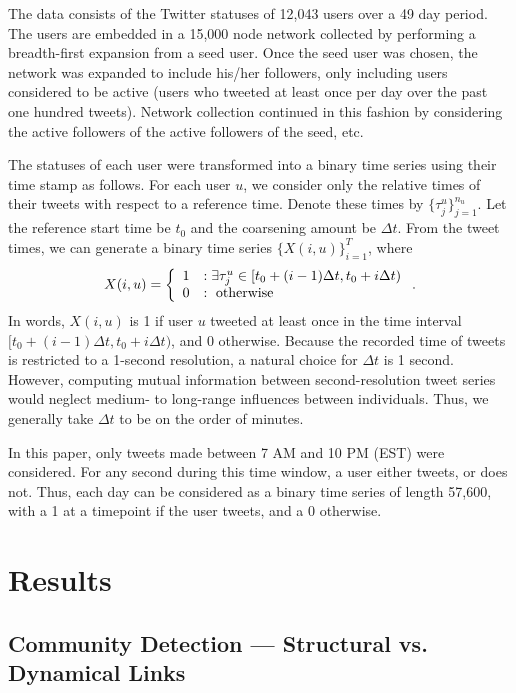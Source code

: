 \documentclass[12pt]{article}
\begin{document}
The data consists of the Twitter statuses of 12,043 users over a 49 day period. The users are embedded in a 15,000 node network collected by performing a breadth-first expansion from a seed user. Once the seed user was chosen, the network was expanded to include his/her followers, only including users considered to be active (users who tweeted at least once per day over the past one hundred tweets). Network collection continued in this fashion by considering the active followers of the active followers of the seed, etc.

The statuses of each user were transformed into a binary time series using their time stamp as follows. For each user $u$, we consider only the relative times of their tweets with respect to a reference time. Denote these times by $\{ \tau^{u}_{j}\}_{j = 1}^{n_{u}}$. Let the reference start time be $t_{0}$ and the coarsening amount be $\Delta t$. From the tweet times, we can generate a binary time series $\{ X(i, u)\}_{i = 1}^{T}$, where
\begin{align}
	X(i, u) = \left\{ \begin{array}{cl}
		1 &: \text{$ \exists \tau^{u}_{j} \in [t_{0} + (i - 1) \Delta t, t_{0} + i \Delta t)$} \\
		0 &: \text{ otherwise}
	\end{array}\right. .
\end{align}
In words, $X(i, u)$ is 1 if user $u$ tweeted at least once in the time interval $[t_{0} + (i - 1) \Delta t, t_{0} + i \Delta t)$, and 0 otherwise. Because the recorded time of tweets is restricted to a 1-second resolution, a natural choice for $\Delta t$ is 1 second. However, computing mutual information between second-resolution tweet series would neglect medium- to long-range influences between individuals. Thus, we generally take $\Delta t$ to be on the order of minutes.

In this paper, only tweets made between 7 AM and 10 PM (EST) were considered. For any second during this time window, a user either tweets, or does not. Thus, each day can be considered as a binary time series of length 57,600, with a 1 at a timepoint if the user tweets, and a 0 otherwise.

\section{Results}

\subsection{Community Detection --- Structural vs. Dynamical Links}
\end{document}
